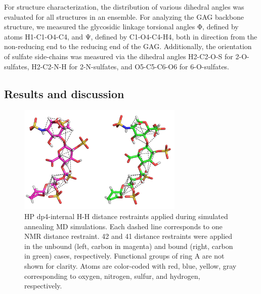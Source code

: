 For structure characterization, the distribution of various dihedral angles was
evaluated for all structures in an ensemble. For analyzing the GAG backbone
structure, we measured the glycosidic linkage torsional angles Φ, defined by
atoms H1-C1-O4-C4, and Ψ, defined by C1-O4-C4-H4, both in direction from the
non-reducing end to the reducing end of the GAG. Additionally, the orientation
of sulfate side-chains was measured via the dihedral angles H2-C2-O-S for
2-O-sulfates, H2-C2-N-H for 2-N-sulfates, and O5-C5-C6-O6 for 6-O-sulfates.

\subsection{Results and discussion}
\label{nmr:results_discussion}

\begin{figure}
\centering
\includegraphics[width=0.7\textwidth]{gfx/nmr/two_cases_dashed_lines_distances.png}
\caption[]{
HP dp4-internal H-H distance restraints applied during simulated annealing MD
simulations. Each dashed line corresponds to one NMR distance restraint. 42 and
41 distance restraints were applied in the unbound (left, carbon in magenta) and
bound (right, carbon in green) cases, respectively. Functional groups of ring A
are not shown for clarity. Atoms are color-coded with red, blue, yellow, gray
corresponding to oxygen, nitrogen, sulfur, and hydrogen, respectively. }
\label{fig:nmr:hp_dashed_lines_distances}
\end{figure}


